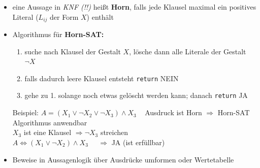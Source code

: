 \documentclass[10pt,a4paper]{article}
\begin{document}
\begin{itemize}
\item eine Aussage in \textit{KNF (!!)} heißt \textbf{Horn}, falls jede Klausel maximal ein positives Literal ($L_{ij}$ der Form $X$) enthält
\item Algorithmus für \textbf{Horn-SAT:} 
\begin{enumerate}
\item suche nach Klausel der Gestalt $X$, lösche dann alle Literale der Gestalt $\lnot X$
\item falls dadurch leere Klausel entsteht \texttt{return} NEIN
\item gehe zu 1. solange noch etwas gelöscht werden kann; danach \texttt{return} JA 
\end{enumerate}
Beispiel: $A=(X_{1}\lor \lnot X_{2}\lor \lnot X_{3})\land X_{3}\;\;\;$ Ausdruck ist Horn $\Rightarrow$ Horn-SAT Algorithmus anwendbar\\
$X_{3}$ ist eine Klausel $\Rightarrow \lnot X_{3}$ streichen \\
$A\Leftrightarrow (X_{1}\lor \lnot X_{2})\land X_{3}\;\;\;\;\; \Rightarrow$ JA (ist erfüllbar)
\item Beweise in Aussagenlogik über Ausdrücke umformen oder Wertetabelle
\end{itemize}
\end{document}
